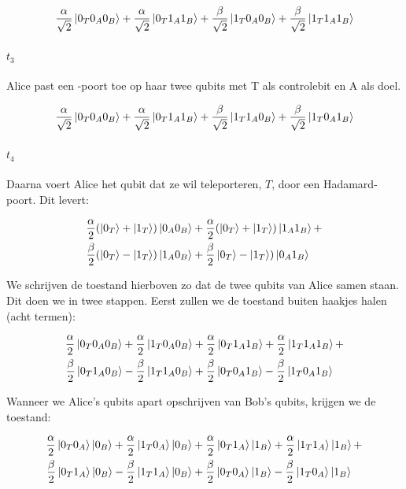 \documentclass[../../main.tex]{subfiles}
\begin{document}
\[\begin{aligned}
\frac{\alpha}{\sqrt{2}}\ket{0_T0_A0_B} +
\frac{\alpha}{\sqrt{2}}\ket{0_T1_A1_B} +
\frac{\beta}{\sqrt{2}}\ket{1_T0_A0_B} +
\frac{\beta}{\sqrt{2}}\ket{1_T1_A1_B}
\end{aligned}\]

\paragraph*{$t_3$} Alice past een -poort toe op haar twee qubits met T als controlebit en A als doel. 

\[\begin{aligned}
\frac{\alpha}{\sqrt{2}}\ket{0_T0_A0_B} +
\frac{\alpha}{\sqrt{2}}\ket{0_T1_A1_B} +
\frac{\beta}{\sqrt{2}}\ket{1_T1_A0_B}  +
\frac{\beta}{\sqrt{2}}\ket{1_T0_A1_B}
\end{aligned}\]

\paragraph*{$t_4$}Daarna voert Alice het qubit dat ze wil teleporteren, $T$, door een Hadamard-poort. Dit levert:

\[\begin{aligned}
\frac{\alpha}{2}(\ket{0_T}+\ket{1_T})\ket{0_A0_B} &+
\frac{\alpha}{2}(\ket{0_T}+\ket{1_T})\ket{1_A1_B} +\\
\frac{\beta}{2}(\ket{0_T}-\ket{1_T})\ket{1_A0_B} &+ 
\frac{\beta}{2}\ket{0_T}-\ket{1_T})\ket{0_A1_B}
\end{aligned}\]

We schrijven de toestand hierboven zo dat de twee qubits van Alice samen staan. Dit doen we in twee stappen. Eerst zullen we de toestand buiten haakjes halen (acht termen):

\[\begin{aligned}
\frac{\alpha}{2}\ket{0_T0_A0_B} + \frac{\alpha}{2}\ket{1_T0_A0_B} &+ 
\frac{\alpha}{2}\ket{0_T1_A1_B} + \frac{\alpha}{2}\ket{1_T1_A1_B} +\\
\frac{\beta}{2}\ket{0_T1_A0_B} - \frac{\beta}{2}\ket{1_T1_A0_B} &+
\frac{\beta}{2}\ket{0_T0_A1_B} - \frac{\beta}{2}\ket{1_T0_A1_B}
\end{aligned}\]

Wanneer we Alice's qubits apart opschrijven van Bob's qubits, krijgen we de toestand:

\[\begin{aligned}
\frac{\alpha}{2}\ket{0_T0_A}\ket{0_B} +\frac{\alpha}{2}\ket{1_T0_A}\ket{0_B} &+\frac{\alpha}{2}\ket{0_T1_A}\ket{1_B} +\frac{\alpha}{2}\ket{1_T1_A}\ket{1_B} +\\
\frac{\beta}{2}\ket{0_T1_A}\ket{0_B} -\frac{\beta}{2}\ket{1_T1_A}\ket{0_B} &+\frac{\beta}{2}\ket{0_T0_A}\ket{1_B} -\frac{\beta}{2}\ket{1_T0_A}\ket{1_B}
\end{aligned}\]
\end{document}
